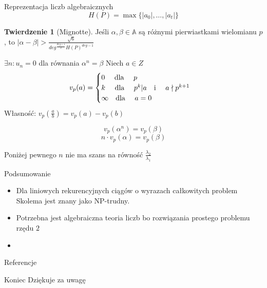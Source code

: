 \documentclass[handout]{beamer}
\def\Z{\mathbb Z}
\def\A{\mathbb{A}}
\theoremstyle{definition}
\newtheorem*{definicja}{Definicja}
\newtheorem*{twierdzenie}{Twierdzenie}
\theoremstyle{named}
\begin{document}
\begin{frame}{Reprezentacja liczb algebraicznych}
    $$H(P) = \max \{ |a_0|, \ldots, |a_t| \}$$
    \begin{twierdzenie}[Mignotte]
            Jeśli $\alpha, \beta \in \A$ są różnymi pierwiastkami wielomianu $p$, to 
            $|\alpha - \beta| > \frac{\sqrt{6}}{deg^{\frac{deg+1}{2}} H(P)^{deg-1}}$
    \end{twierdzenie}
\end{frame}



\begin{frame}{$\exists n: u_n = 0$ dla równania $\alpha^{n} = \beta$}
Niech $a \in Z$
\begin{equation}
v_p(a)= 
    \begin{cases}
        0 \text{ \quad dla \quad } p \\
        k \text{ \quad dla \quad } p^{k} | a  \text{\quad i \quad } a \nmid p^{k+1} \\
        \infty \text{\quad dla \quad} a= 0
    \end{cases}
\end{equation}
Własność:
$v_p(\frac{a}{b}) = v_p(a) - v_p(b)$


\[
    v_{p}(\alpha^{n}) = v_p(\beta) 
\]
\[
    n \cdot v_{p}(\alpha) = v_{p}(\beta)
\]

Poniżej pewnego $n$ nie ma szans na równość $\frac{\lambda_2}{\lambda_1}$

\end{frame}

\begin{frame}{Podsumowanie}
    \begin{itemize}
        \item  Dla liniowych rekurencyjnych ciągów o wyrazach całkowitych problem Skolema jest znany jako NP-trudny. \cite{BLONDEL200291}
        \item Potrzebna jest algebraiczna teoria liczb bo rozwiązania prostego problemu rzędu $2$
        \item 
    \end{itemize}
\end{frame}

\begin{frame}{Referencje}
    
    
\end{frame}

\begin{frame}{Koniec}
    Dziękuje za uwagę
\end{frame}
\end{document}
